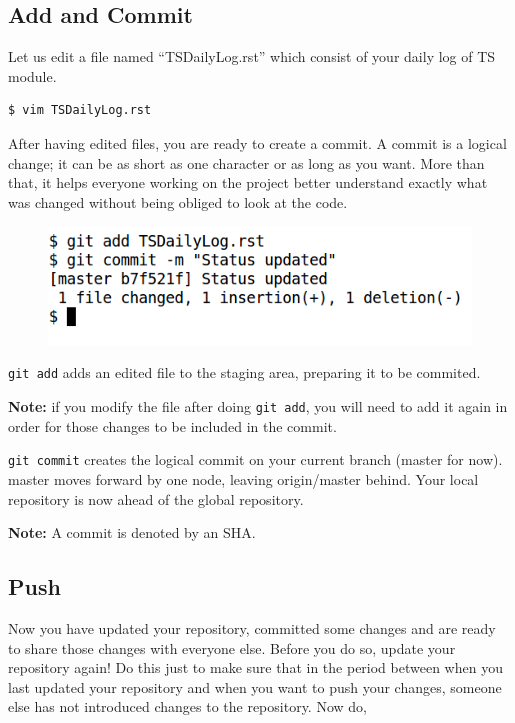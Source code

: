 \documentclass[11pt,a4paper]{article}
\begin{document}
\subsection*{Add and Commit}
Let us  edit a file named ``TSDailyLog.rst'' which consist of your daily log of TS module.
\begin{verbatim}
$ vim TSDailyLog.rst
\end{verbatim}
After having edited files, you are ready to create a commit. A commit is a logical change; it can be as short as one character or as long as you want. More than that, it helps everyone working on the project better understand exactly what was changed without being obliged to look at the code.
\begin{figure}[H]
    \begin{center}
        \includegraphics[scale=0.4]{clone-commit.png}       
       \end{center}
    \end{figure}
\texttt{git add} adds an edited file to the staging area, preparing it to be commited. 

\textbf{Note:} if you modify the file after doing \texttt{git add}, you will need to add it again in order for those changes to be included in the commit.

\texttt{git commit} creates the logical commit on your current branch (master for now). master moves forward by one node, leaving origin/master behind. Your local repository is now ahead of the global repository. 

\textbf{Note:} A commit is denoted by an SHA.
\subsection*{Push}
Now you have updated your repository, committed some changes and are ready to share those changes with everyone else. Before you do so, update your repository again! Do this just to make sure that in the period between when you last updated your repository and when you want to push your changes, someone else has not introduced changes to the repository. Now do,
\end{document}

